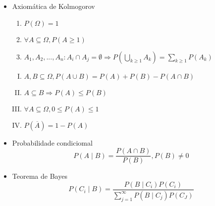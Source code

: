 \documentclass{article}
\begin{document}
\newpage
\begin{multicols*}{2}
\begin{itemize}
    \item{Axiomática de Kolmogorov}
        \begin{enumerate}
            \item $P(\Omega) = 1$
            \item $\forall A \subseteq \Omega, P(A \geq 1)$
            \item $A_1, A_2, ..., A_n: A_i \cap A_j = \emptyset \Rightarrow P (\bigcup\limits_{k \geq 1} A_k) = \sum\limits_{k\geq 1} P(A_k)$
        \end{enumerate}
        \begin{enumerate}[I)]
            \item $A, B \subseteq \Omega, P(A \cup B) = P(A) + P(B) - P(A \cap B) $
            \item $A \subseteq B \Rightarrow P(A) \leq P(B)$
            \item $\forall A \subseteq \Omega, 0 \leq P(A) \leq 1$
            \item $P(\overline{A}) = 1 - P(A)$
        \end{enumerate}

    \item{Probabilidade condiciomal}
        $$P(A \mid B) = \frac{P(A \cap B)}{P(B)}, P(B) \neq 0$$

    \item{Teorema de Bayes}
        $$P(C_i \mid B) = \frac{P(B \mid C_i)P(C_i)}{\sum_{j=1}^{\infty} P(B \mid C_j)P(C_J)}$$


\end{itemize}
\end{multicols*}
\end{document}

